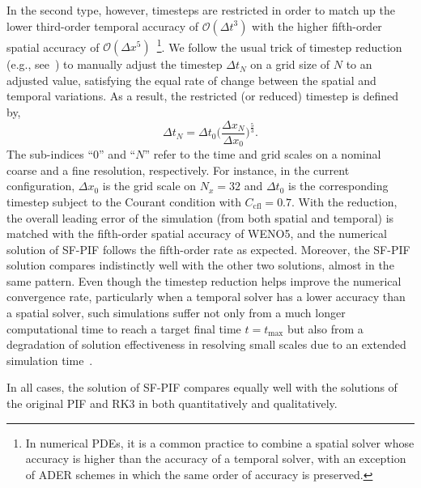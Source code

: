 \documentclass[times,preprint,3p]{elsarticle}
\newcommand{\beq}{\begin{equation}}
\newcommand{\eeq}{\end{equation}}
\newcommand{\dt}{\Delta t}
\newcommand{\dx}{\Delta x}
\begin{document}
%
In the second type, however, timesteps are restricted in order to
match up the lower third-order temporal accuracy of $\mathcal{O}(\Delta t^3)$
with the higher fifth-order spatial accuracy of $\mathcal{O}(\Delta x^5)$~\footnote[$\S$]
    {In numerical PDEs, it is a common practice to combine a spatial solver
    whose accuracy is higher than the accuracy of a temporal solver, with
    an exception of ADER schemes in which
    the same order of accuracy is preserved.
    }.
We follow the usual trick of timestep reduction (e.g., see~\cite{mignone2010high}) to
manually adjust the timestep $\Delta t_N$ on a grid size of $N$  to
an adjusted value, satisfying the equal rate of change between the
spatial and temporal variations.
As a result, the restricted (or reduced) timestep is defined by, %
\begin{equation}\label{Eq:dt_reduction_a}
    {\Delta t_N} = {\Delta t_0} \Big( \frac{\Delta x_N}{\Delta x_0} \Big)^{\frac{5}{3}}.
\end{equation}
The sub-indices ``$0$'' and ``$N$'' refer to the
time and grid scales on a nominal coarse and a fine resolution, respectively.
For instance, in the current configuration,
$\dx_0$ is the grid scale on $N_x=32$ and
$\dt_0$ is the corresponding timestep subject to the Courant condition with $C_{\text{cfl}}=0.7$.
%
With the reduction, the overall leading error of the simulation
(from both spatial and temporal)
is matched with the fifth-order spatial accuracy of WENO5, and
the numerical solution of SF-PIF follows the fifth-order rate as expected.
Moreover, the SF-PIF solution compares indistinctly well with the other two solutions,
almost in the same pattern.
%
Even though the timestep reduction helps improve the numerical convergence rate,
particularly when a temporal solver has a lower accuracy than a spatial solver,
such simulations suffer not only from a much longer computational time to reach a target
final time $t=t_{\max}$ but also from a degradation of solution effectiveness
in resolving small scales due to an extended
simulation time~\cite{kent2014determining_part1,kent2014determining_part2}.

In all cases, the solution of SF-PIF compares equally well with the solutions of the original PIF
and RK3 in both quantitatively and qualitatively.
\end{document}
